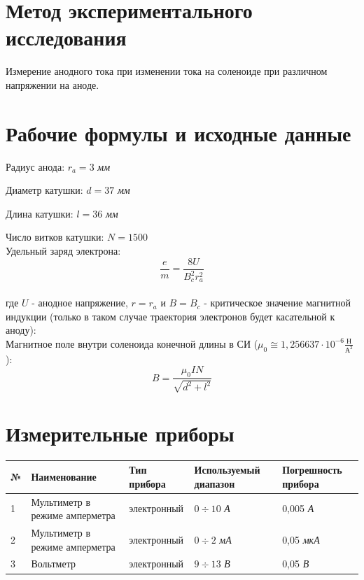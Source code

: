 \documentclass[12pt]{article}
\begin{document}
\section{Метод экспериментального исследования}
Измерение анодного тока при изменении тока на соленоиде при различном напряжении на аноде.

\section{Рабочие формулы и исходные данные}

Радиус анода: $r_a = 3$ \textit{мм}

Диаметр катушки: $d=37$ \textit{мм}

Длина катушки: $l=36$ \textit{мм}

Число витков катушки: $N=1500$ \\

Удельный заряд электрона:
\begin{equation}
    \frac{e}{m}=\frac{8U}{B_c^2r_a^2}
    \label{eqn:specific_charge}
\end{equation} \\
где $U$ - анодное напряжение, $r=r_a$ и $B=B_c$ - критическое значение магнитной индукции (только в таком случае траектория электронов будет касательной к аноду): \\

Магнитное поле внутри соленоида конечной длины в СИ ($\mu_0\cong1,256637\cdot10^{-6} \frac{\textit{Н}}{\textit{А}^{2}}$):
\begin{equation}
     B=\frac{\mu_0 IN}{\sqrt{d^2+l^2}}
     \label{eqn:critic_induction}
\end{equation}

\section{Измерительные приборы}
\begin{center}
\begin{tabular}{ | m{0.5cm} | m{7cm}| m{3cm} | m{3cm} | m{3cm} | } 
  \hline
  № & Наименование & Тип прибора & Используемый диапазон & Погрешность прибора \\ 
  \hline
  1 & Мультиметр в режиме амперметра & электронный& $0\div 10$ \textit{А}& 0,005 \textit{А} \\ 
  \hline
   2 & Мультиметр в режиме амперметра &электронный & $0 \div 2 $ \textit{мА}& 0,05 \textit{мкА}\\ 
   \hline
   3 & Вольтметр & электронный & $9\div13$ \textit{В}& 0,05 \textit{В}\\
  \hline
\end{tabular}
\end{center}
\end{document}
